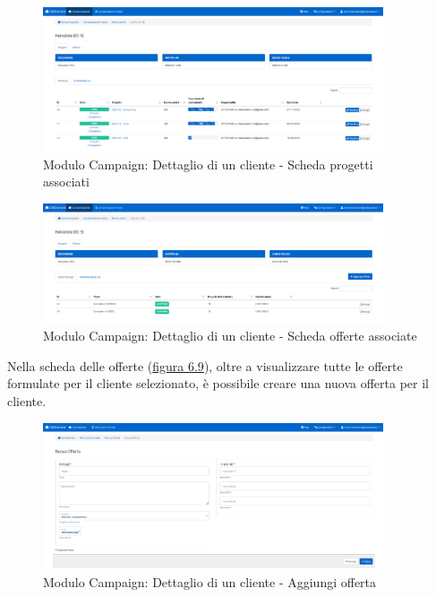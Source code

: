 \begin{figure}[!h]
\centering
\includegraphics[width=380px]{../images/UI/09-dettaglioClienteTab1.png}
\caption{Modulo Campaign: Dettaglio di un cliente - Scheda progetti associati}
\label{fig:dettaglioCliente1}
\end{figure} 

\begin{figure}[!h]
\centering
\includegraphics[width=380px]{../images/UI/09-dettaglioClienteTab2.png}
\caption{Modulo Campaign: Dettaglio di un cliente - Scheda offerte associate}
\label{fig:dettaglioCliente2}
\end{figure}

\noindent Nella scheda delle offerte ({\hyperref[fig:dettaglioCliente2]{figura 6.9}}), oltre a visualizzare tutte le offerte formulate per il cliente selezionato, è possibile creare una nuova offerta per il cliente.

\pagebreak

\begin{figure}[!h]
\centering
\includegraphics[width=380px]{../images/UI/10-nuovaOfferta.png}
\caption{Modulo Campaign: Dettaglio di un cliente - Aggiungi offerta}
\label{fig:nuovaOfferta}
\end{figure}


